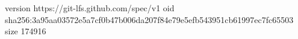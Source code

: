 version https://git-lfs.github.com/spec/v1
oid sha256:3a95aa03572e5a7cf0b47b006da207f84e79e5efb543951cb61997ec7fc65503
size 174916
